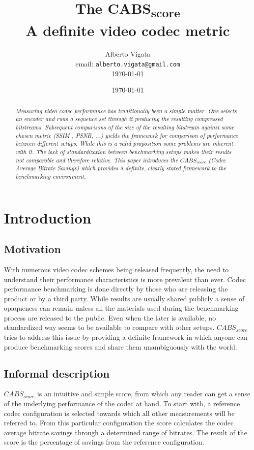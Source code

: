 \documentclass[10pt, conference, hidelinks, onecolumn]{IEEEtran}
\title{The CABS\textsubscript{score} \\ A definite video codec metric}
\author{Alberto Vigata\\ email: {\tt alberto.vigata@gmail.com}\\ \today}
\date{\today}
\begin{document}
    \maketitle
    \vspace{1mm}
    \begin{abstract}
    \textit{
    \noindent
Measuring video codec performance has traditionally been a simple matter. One selects an encoder and runs a sequence set through it producing the resulting compressed bitstreams. Subsequent comparisons of the size of the resulting bitstream against some chosen metric (SSIM \cite{ssim}, PSNR, ...) yields the framework for comparison of performance between different setups. While this is a valid proposition some problems are inherent with it. The lack of standardization between benchmarking setups makes their results not comparable and therefore relative. This paper introduces the $CABS_{score}$ (Codec Average Bitrate Savings) which provides a definite, clearly stated framework to the benchmarking environment.
    }
    \end{abstract}
    \vspace{3mm}



\section{Introduction}


\subsection{Motivation}
	With numerous video codec schemes being released frequently, the need to understand their performance characteristics is more prevalent than ever. Codec performance benchmarking is done directly by those who are releasing the product or by a third party. While results are usually shared publicly a sense of opaqueness can remain unless all the materials used during the benchmarking process are released to the public. Even when the later is available, no standardized way seems to be available to compare with other setups. $CABS_{score}$ tries to address this issue by providing a definite framework in which anyone can produce benchmarking scores and share them unambiguously with the world.

\subsection{Informal description}
$CABS_{score}$ is an intuitive and simple score, from which any reader can get a sense of the underlying performance of the codec at hand. To start with, a reference codec configuration is selected towards which all other measurements will be referred to. From this particular configuration the score calculates the codec average bitrate savings through a determined range of bitrates. The result of the score is the percentage of savings from the reference configuration.
\end{document}

